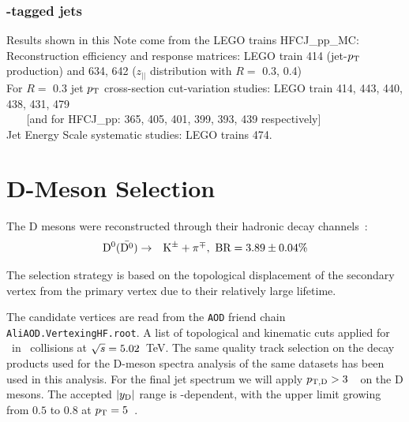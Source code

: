 \subsubsection{\Dzero-tagged jets}
Results shown in this Note come from the LEGO trains HFCJ\_pp\_MC:  
\\Reconstruction efficiency and response matrices: LEGO train {414} (jet-$p_{\text T}$ production) and {634, 642} ($z_{||}$ distribution with $R=$ 0.3, 0.4)
\\For $R=$ 0.3 jet $p_{\text T}$ cross-section cut-variation studies: LEGO train {414, 443, 440, 438, 431, 479} 
\\  ~~~ [and for HFCJ\_pp: {365, 405, 401, 399, 393, 439} respectively] %
\\Jet Energy Scale systematic studies: LEGO trains 474.



\section{D-Meson Selection}
\label{sec:DmesonSel}

The D mesons were reconstructed through their hadronic decay channels~\cite{Tanabashi:2018oca}:
\begin{eqnarray*}
\mathrm{D^{0}} (\bar{\mathrm{D^{0}}}) &\to& {\rm K}^{\pm} + \pi^{\mp}  , {\text{ BR}} = 3.89\pm {0.04} \%\\
\end{eqnarray*}

The selection strategy is based on the topological displacement of the secondary vertex from the primary vertex due to their relatively large lifetime.

The candidate vertices are read from the \texttt{AOD} friend chain \texttt{AliAOD.VertexingHF.root}. A list of topological and kinematic cuts applied for \Dzero\ in \pp\ collisions at $\sqrt{s}=5.02$~TeV.
The same quality track selection on the decay products used for the D-meson spectra analysis of the same datasets has been used in this analysis.
For the final jet spectrum we will apply $p_{\mathrm{T,D}}> 3$~\GeVc\ on the D mesons. The accepted $|y_{\rm D}|$ range is \pt-dependent, with the upper limit growing from $0.5$ to $0.8$ at $p_{\rm T}=5$~\GeVc.

